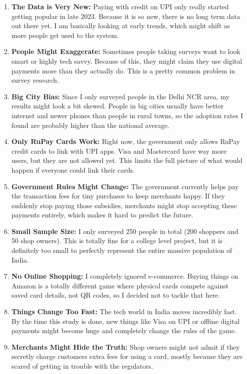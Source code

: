 \begin{enumerate}
    \item \textbf{The Data is Very New:} Paying with credit on UPI only really started getting popular in late 2023. Because it is so new, there is no long term data out there yet. I am basically looking at early trends, which might shift as more people get used to the system.

    \item \textbf{People Might Exaggerate:} Sometimes people taking surveys want to look smart or highly tech savvy. Because of this, they might claim they use digital payments more than they actually do. This is a pretty common problem in survey research.

    \item \textbf{Big City Bias:} Since I only surveyed people in the Delhi NCR area, my results might look a bit skewed. People in big cities usually have better internet and newer phones than people in rural towns, so the adoption rates I found are probably higher than the national average.

    \item \textbf{Only RuPay Cards Work:} Right now, the government only allows RuPay credit cards to link with UPI apps. Visa and Mastercard have way more users, but they are not allowed yet. This limits the full picture of what would happen if everyone could link their cards.

    \item \textbf{Government Rules Might Change:} The government currently helps pay the transaction fees for tiny purchases to keep merchants happy. If they suddenly stop paying those subsidies, merchants might stop accepting these payments entirely, which makes it hard to predict the future.

    \item \textbf{Small Sample Size:} I only surveyed 250 people in total (200 shoppers and 50 shop owners). This is totally fine for a college level project, but it is definitely too small to perfectly represent the entire massive population of India.

    \item \textbf{No Online Shopping:} I completely ignored e-commerce. Buying things on Amazon is a totally different game where physical cards compete against saved card details, not QR codes, so I decided not to tackle that here.

    \item \textbf{Things Change Too Fast:} The tech world in India moves incredibly fast. By the time this study is done, new things like Visa on UPI or offline digital payments might become huge and completely change the rules of the game.

    \item \textbf{Merchants Might Hide the Truth:} Shop owners might not admit if they secretly charge customers extra fees for using a card, mostly because they are scared of getting in trouble with the regulators.
\end{enumerate}

